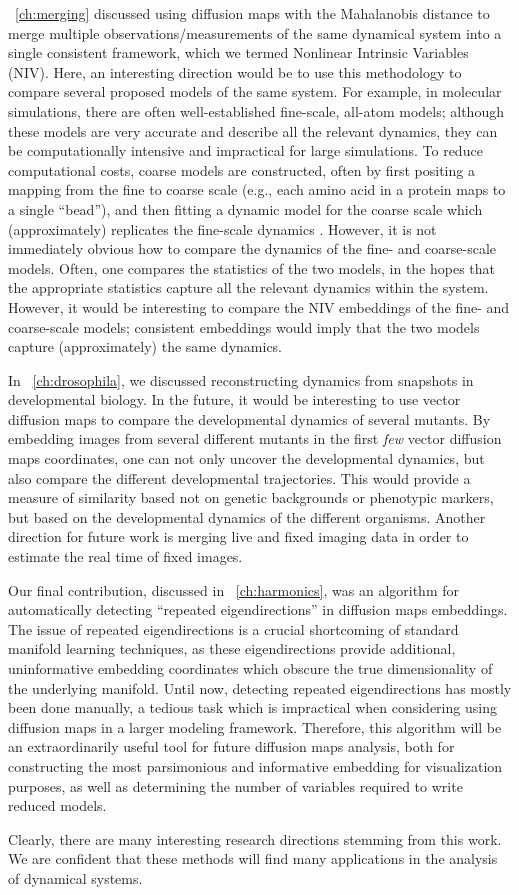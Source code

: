 \chap~\ref{ch:merging} discussed using diffusion maps with the Mahalanobis distance to merge multiple observations/measurements of the same dynamical system into a single consistent framework, which we termed Nonlinear Intrinsic Variables (NIV).
%
Here, an interesting direction would be to use this methodology to compare several proposed models of the same system.
%
For example, in molecular simulations, there are often well-established fine-scale, all-atom models; although these models are very accurate and describe all the relevant dynamics, they can be computationally intensive and impractical for large simulations.
%
To reduce computational costs, coarse models are constructed, often by first positing a mapping from the fine to coarse scale (e.g., each amino acid in a protein maps to a single ``bead''), and then fitting a dynamic model for the coarse scale which (approximately) replicates the fine-scale dynamics \cite{saunders2013coarse, izvekov2005systematic, chaimovich2011coarse}.
%
However, it is not immediately obvious how to compare the dynamics of the fine- and coarse-scale models.
%
Often, one compares the statistics of the two models, in the hopes that the appropriate statistics capture all the relevant dynamics within the system.
%
However, it would be interesting to compare the NIV embeddings of the fine- and coarse-scale models; consistent embeddings would imply that the two models capture (approximately) the same dynamics.

In \chap~\ref{ch:drosophila}, we discussed reconstructing dynamics from snapshots in developmental biology.
%
In the future, it would be interesting to use vector diffusion maps to compare the developmental dynamics of several mutants.
%
By embedding images from several different mutants in the first {\em few} vector diffusion maps coordinates, one can not only uncover the developmental dynamics, but also compare the different developmental trajectories.
%
This would provide a measure of similarity based not on genetic backgrounds or phenotypic markers, but based on the developmental dynamics of the different organisms.
%
Another direction for future work is merging live and fixed imaging data in order to estimate the real time of fixed images.

Our final contribution, discussed in \chap~\ref{ch:harmonics}, was an algorithm for automatically detecting ``repeated eigendirections'' in diffusion maps embeddings.
%
The issue of repeated eigendirections is a crucial shortcoming of standard manifold learning techniques, as these eigendirections provide additional, uninformative embedding coordinates which obscure the true dimensionality of the underlying manifold.
%
Until now, detecting repeated eigendirections has mostly been done manually, a tedious task which is impractical when considering using diffusion maps in a larger modeling framework.
%
Therefore, this algorithm will be an extraordinarily useful tool for future diffusion maps analysis, both for constructing the most parsimonious and informative embedding for visualization purposes, as well as determining the number of variables required to write reduced models.

Clearly, there are many interesting research directions stemming from this work.
%
We are confident that these methods will find many applications in the analysis of dynamical systems.
